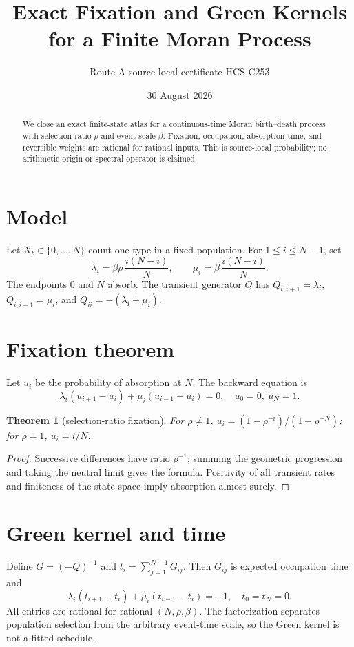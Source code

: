 \documentclass[10pt]{article}
\title{Exact Fixation and Green Kernels for a Finite Moran Process}
\author{Route-A source-local certificate HCS-C253}
\date{30 August 2026}
\newtheorem{theorem}{Theorem}
\begin{document}
\maketitle
\begin{abstract}
We close an exact finite-state atlas for a continuous-time Moran birth--death
process with selection ratio $\rho$ and event scale $\beta$. Fixation,
occupation, absorption time, and reversible weights are rational for rational
inputs. This is source-local probability; no arithmetic origin or spectral
operator is claimed.
\end{abstract}
\section{Model}
Let $X_t\in\{0,\ldots,N\}$ count one type in a fixed population. For
$1\le i\le N-1$, set
\[
\lambda_i=\beta\rho\,\frac{i(N-i)}N,\qquad
\mu_i=\beta\,\frac{i(N-i)}N. \tag{1}
\]
The endpoints $0$ and $N$ absorb. The transient generator $Q$ has
$Q_{i,i+1}=\lambda_i$, $Q_{i,i-1}=\mu_i$, and
$Q_{ii}=-(\lambda_i+\mu_i)$.
\section{Fixation theorem}
Let $u_i$ be the probability of absorption at $N$. The backward equation is
\[
\lambda_i(u_{i+1}-u_i)+\mu_i(u_{i-1}-u_i)=0,\quad u_0=0,\ u_N=1.
\]
\begin{theorem}[selection-ratio fixation]
For $\rho\ne1$, $u_i=(1-\rho^{-i})/(1-\rho^{-N})$; for $\rho=1$,
$u_i=i/N$.
\end{theorem}
\begin{proof}
Successive differences have ratio $\rho^{-1}$; summing the geometric
progression and taking the neutral limit gives the formula. Positivity of
all transient rates and finiteness of the state space imply absorption almost
surely.
\end{proof}
\section{Green kernel and time}
Define $G=(-Q)^{-1}$ and $t_i=\sum_{j=1}^{N-1}G_{ij}$. Then $G_{ij}$ is
expected occupation time and
\[
\lambda_i(t_{i+1}-t_i)+\mu_i(t_{i-1}-t_i)=-1,\quad t_0=t_N=0. \tag{2}
\]
All entries are rational for rational $(N,\rho,\beta)$.
The factorization separates population selection from the arbitrary event-time
scale, so the Green kernel is not a fitted schedule.
\end{document}

